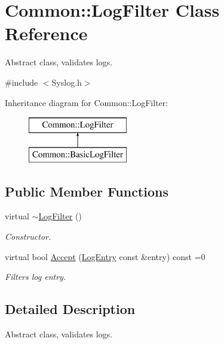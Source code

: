 \hypertarget{class_common_1_1_log_filter}{\section{Common\-:\-:Log\-Filter Class Reference}
\label{class_common_1_1_log_filter}
}


Abstract class, validates logs.  




{\ttfamily \#include $<$Syslog.\-h$>$}

Inheritance diagram for Common\-:\-:Log\-Filter\-:\begin{figure}[H]
\begin{center}
\leavevmode
\includegraphics[height=2.000000cm]{class_common_1_1_log_filter}
\end{center}
\end{figure}
\subsection*{Public Member Functions}
\begin{DoxyCompactItemize}
\item 
\hypertarget{class_common_1_1_log_filter_aa866b9b88b43ca6eea8d9f66db7d18d7}{virtual \hyperlink{class_common_1_1_log_filter_aa866b9b88b43ca6eea8d9f66db7d18d7}{$\sim$\-Log\-Filter} ()}\label{class_common_1_1_log_filter_aa866b9b88b43ca6eea8d9f66db7d18d7}

\begin{DoxyCompactList}\small\item\em Constructor. \end{DoxyCompactList}\item 
virtual bool \hyperlink{class_common_1_1_log_filter_aebeae402434ad214e21321de025ee890}{Accept} (\hyperlink{class_common_1_1_log_entry}{Log\-Entry} const \&entry) const =0
\begin{DoxyCompactList}\small\item\em Filters log entry. \end{DoxyCompactList}\end{DoxyCompactItemize}


\subsection{Detailed Description}
Abstract class, validates logs. 

